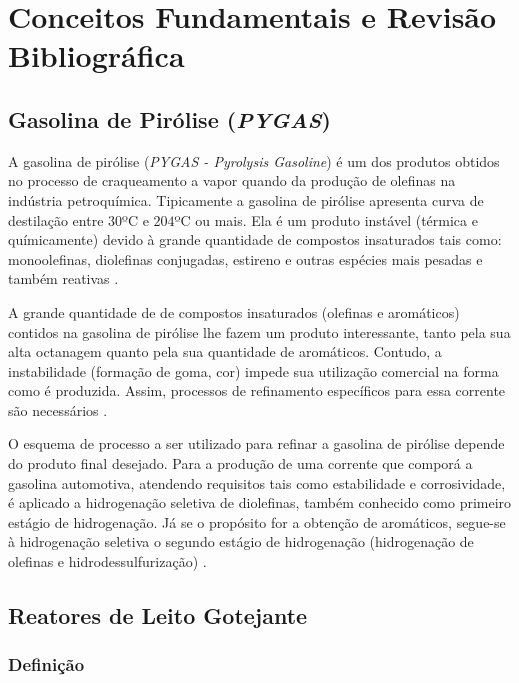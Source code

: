 %
% 
%
\chapter{Conceitos Fundamentais e Revisão Bibliográfica}
\label{chap:revisaobibliografica}

\section{Gasolina de Pirólise (\emph{PYGAS})} \label{sec:pygas}
A gasolina de pirólise (\emph{PYGAS - Pyrolysis Gasoline}) é um dos produtos
obtidos no processo de craqueamento a vapor quando da produção de olefinas na
indústria petroquímica. Tipicamente a gasolina de pirólise apresenta curva de
destilação entre $30$\si{ºC} e $204$\si{ºC} ou mais. Ela é um produto instável
(térmica e químicamente) devido à grande quantidade de compostos insaturados
tais como: monoolefinas, diolefinas conjugadas, estireno e outras espécies mais
pesadas e também reativas \cite{Cheng1986}.
 
A grande quantidade de de compostos insaturados (olefinas e aromáticos) contidos
na gasolina de pirólise lhe fazem um produto interessante, tanto pela
sua alta octanagem quanto pela sua quantidade de aromáticos. Contudo, a
instabilidade (formação de goma, cor) impede sua utilização comercial na forma como é produzida. Assim,
processos de refinamento específicos para essa corrente são necessários
\cite{Derrien1986}.

O esquema de processo a ser utilizado para refinar a gasolina de pirólise
depende do produto final desejado. Para a produção de uma corrente que
comporá a gasolina automotiva, atendendo requisitos tais como estabilidade e
corrosividade, é aplicado a hidrogenação seletiva de diolefinas, também
conhecido como primeiro estágio de hidrogenação. Já se o propósito for a
obtenção de aromáticos, segue-se à hidrogenação seletiva o segundo estágio
de hidrogenação (hidrogenação de olefinas e hidrodessulfurização)
\cite{Derrien1986}.

\section{Reatores de Leito Gotejante} \label{sec:reatorestbr}

\subsection{Definição} \label{denicao}

